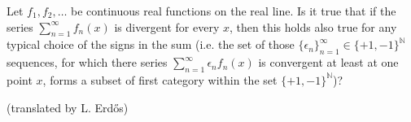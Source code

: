 Let $f_1, f_2, \ldots$ be continuous real functions on the real line. Is it true that if the series $\sum_{n=1}^{\infty} f_n(x)$ is divergent for every $x$, then this holds also true for any typical choice of the signs in the sum (i.e. the set of those $\{ \epsilon _n\}_{n=1}^{\infty} \in \{ +1, -1\}^{\mathbb{N}}$ sequences, for which there series $\sum_{n=1}^{\infty} \epsilon_nf_n(x)$ is convergent at least at one point $x$, forms a subset of first category within the set $\{+1,-1\}^{\mathbb{N}} $)?

(translated by L. Erdős)